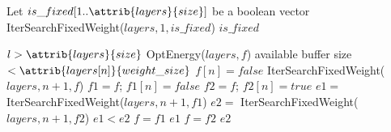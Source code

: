 \begin{codebox}
\li Let $is\_fixed[1 .. \attrib{layers}{size}]$ be a boolean vector
\li IterSearchFixedWeight($layers, 1, is\_fixed$)
\li \Return $is\_fixed$
\end{codebox}

\begin{codebox}
\li \If $l > \attrib{layers}{size}$
\li	\Do
     \Return OptEnergy($layers, f$)
  \End
\li \If available buffer size $< \attrib{layers[n]}{weight\_size}$
\li	\Do
     $f[n] = false$
\li 	\Return IterSearchFixedWeight($layers, n+1, f$)
  \End
\li $f1 = f$; $f1[n] = false$
\li $f2 = f$; $f2[n] = true$
\li $e1 =$ IterSearchFixedWeight($layers, n+1, f1$)
\li $e2 =$ IterSearchFixedWeight($layers, n+1, f2$)
\li \If $e1 < e2$
\li	\Do
     $f = f1$
\li 	\Return $e1$
\li	\Else
\li 	$f = f2$
\li 	\Return $e2$
  \End
\end{codebox}
